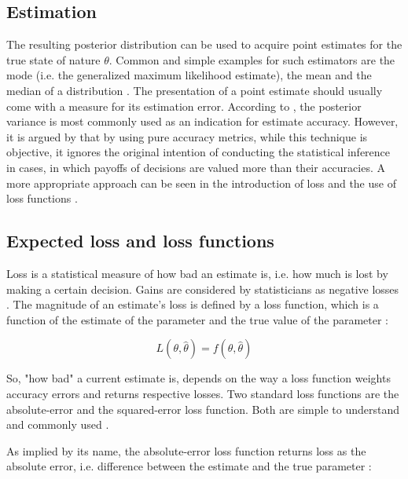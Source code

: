         \subsection{Estimation}
        The resulting posterior distribution can be used to acquire point estimates for the true state of nature $\theta$. Common and simple examples for such estimators are the mode (i.e. the generalized maximum likelihood estimate), the mean and the median of a distribution \cite{berger2013stat}. The presentation of a point estimate should usually come with a measure for its estimation error. According to \cite{berger2013stat}, the posterior variance is most commonly used as an indication for estimate accuracy. However, it is argued by \cite{davidson2015} that by using pure accuracy metrics, while this technique is objective, it ignores the original intention of conducting the statistical inference in cases, in which payoffs of decisions are valued more than their accuracies. A more appropriate approach can be seen in the introduction of loss and the use of loss functions \cite{davidson2015}.
        
        \subsection{Expected loss and loss functions} 
        Loss is a statistical measure of how bad an estimate is, i.e. how much is lost by making a certain decision. Gains are considered by statisticians as negative losses \cite{davidson2015}.
        The magnitude of an estimate's loss is defined by a loss function, which is a function of the estimate of the parameter and the true value of the parameter \cite{davidson2015}:
        
        \begin{equation}\label{eq:LossFunction}
        L(\theta,\hat{\theta}) = f(\theta,\hat{\theta})
        \end{equation}
        
        So, "how bad" a current estimate is, depends on the way a loss function weights accuracy errors and returns respective losses. Two standard loss functions are the absolute-error and the squared-error loss function. Both are simple to understand and commonly used \cite{davidson2015}.
        
        As implied by its name, the absolute-error loss function returns loss as the absolute error, i.e. difference between the estimate and the true parameter \cite{davidson2015}:
        
